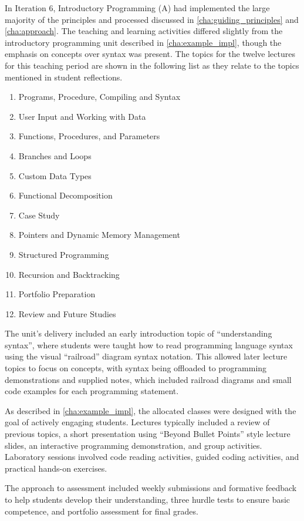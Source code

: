 In Iteration 6, Introductory Programming (A) had implemented the large majority of the principles and processed discussed in \cref{cha:guiding_principles} and \cref{cha:approach}. The teaching and learning activities differed slightly from the introductory programming unit described in \cref{cha:example_impl}, though the emphasis on concepts over syntax was present. The topics for the twelve lectures for this teaching period are shown in the following list as they relate to the topics mentioned in student reflections.
\begin{enumerate}
  \item Programs, Procedure, Compiling and Syntax
  \item User Input and Working with Data
  \item Functions, Procedures, and Parameters
  \item Branches and Loops
  \item Custom Data Types
  \item Functional Decomposition
  \item Case Study
  \item Pointers and Dynamic Memory Management
  \item Structured Programming
  \item Recursion and Backtracking
  \item Portfolio Preparation
  \item Review and Future Studies
\end{enumerate}

The unit's delivery included an early introduction topic of ``understanding syntax'', where students were taught how to read programming language syntax using the visual ``railroad'' diagram syntax notation. This allowed later lecture topics to focus on concepts, with syntax being offloaded to programming demonstrations and supplied notes, which included railroad diagrams and small code examples for each programming statement.

As described in \cref{cha:example_impl}, the allocated classes were designed with the goal of actively engaging students. Lectures typically included a review of previous topics, a short presentation using ``Beyond Bullet Points'' style lecture slides, an interactive programming demonstration, and group activities. Laboratory sessions involved code reading activities, guided coding activities, and practical hands-on exercises.

The approach to assessment included weekly submissions and formative feedback to help students develop their understanding, three hurdle tests to ensure basic competence, and portfolio assessment for final grades.

